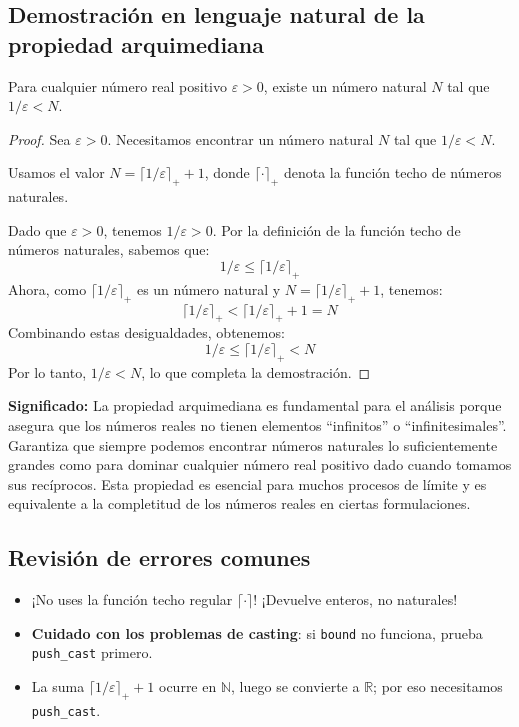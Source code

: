 \subsection{Demostración en lenguaje natural de la propiedad arquimediana}

\begin{theorem}
  Para cualquier número real positivo $\varepsilon > 0$, existe un número natural $N$ tal que $1/\varepsilon < N$.
\end{theorem}

\begin{proof}
Sea $\varepsilon > 0$. Necesitamos encontrar un número natural $N$ tal que $1/\varepsilon <
N$.

Usamos el valor $N = \lceil 1/\varepsilon \rceil_+ + 1$, donde $\lceil \cdot \rceil_+$ denota la función
techo de números naturales.

Dado que $\varepsilon > 0$, tenemos $1/\varepsilon > 0$. Por la definición de la función techo de números naturales, sabemos que:
\[ 1/\varepsilon \le \lceil 1/\varepsilon \rceil_+ \]
Ahora, como $\lceil 1/\varepsilon \rceil_+$ es un número natural y $N = \lceil 1/\varepsilon \rceil_+ + 1$, tenemos:
\[ \lceil 1/\varepsilon \rceil_+ < \lceil 1/\varepsilon \rceil_+ + 1 = N \]
Combinando estas desigualdades, obtenemos:
\[ 1/\varepsilon \le \lceil 1/\varepsilon \rceil_+ < N \]
Por lo tanto, $1/\varepsilon < N$, lo que completa la demostración.
\end{proof}

\textbf{Significado:} La propiedad arquimediana es fundamental para el análisis porque asegura que los números reales no tienen elementos ``infinitos'' o ``infinitesimales''. Garantiza que siempre podemos encontrar números naturales lo suficientemente grandes como para dominar cualquier número real positivo dado cuando tomamos sus recíprocos. Esta propiedad es esencial para muchos procesos de límite y es equivalente a la completitud de los números reales en ciertas formulaciones.

\subsection{Revisión de errores comunes}
\begin{itemize}
    \item ¡No uses la función techo regular $\lceil \cdot \rceil$! ¡Devuelve enteros, no naturales!
    \item \textbf{Cuidado con los problemas de casting}: si \texttt{bound} no funciona, prueba \texttt{push\_cast} primero.
    \item La suma $\lceil 1/\varepsilon \rceil_+ + 1$ ocurre en $\mathbb{N}$, luego se convierte a $\mathbb{R}$; por eso necesitamos \texttt{push\_cast}.
\end{itemize}

